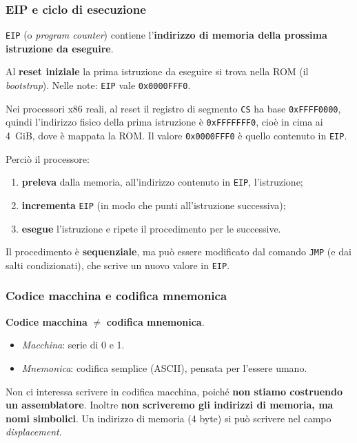 \documentclass[11pt,a4paper]{article}
\begin{document}
\subsubsection*{EIP e ciclo di esecuzione}

\texttt{EIP} (o \emph{program counter}) contiene l'\textbf{indirizzo di memoria della prossima istruzione da eseguire}.

Al \textbf{reset iniziale} la prima istruzione da eseguire si trova nella ROM (il \emph{bootstrap}). Nelle note: \texttt{EIP} vale \texttt{0x0000FFF0}.

\begin{integrazione}
Nei processori x86 reali, al reset il registro di segmento \texttt{CS} ha base \texttt{0xFFFF0000}, quindi l'indirizzo fisico della prima istruzione è \texttt{0xFFFFFFF0}, cioè in cima ai 4~GiB, dove è mappata la ROM. Il valore \texttt{0x0000FFF0} è quello contenuto in \texttt{EIP}.
\end{integrazione}

Perciò il processore:
\begin{enumerate}[leftmargin=*]
  \item \textbf{preleva} dalla memoria, all'indirizzo contenuto in \texttt{EIP}, l'istruzione;
  \item \textbf{incrementa} \texttt{EIP} (in modo che punti all'istruzione successiva);
  \item \textbf{esegue} l'istruzione e ripete il procedimento per le successive.
\end{enumerate}

Il procedimento è \textbf{sequenziale}, ma può essere modificato dal comando \texttt{JMP} (e dai salti condizionati), che scrive un nuovo valore in \texttt{EIP}.

\subsubsection*{Codice macchina e codifica mnemonica}

\textbf{Codice macchina} $\neq$ \textbf{codifica mnemonica}.
\begin{itemize}[leftmargin=*]
  \item \emph{Macchina}: serie di 0 e 1.
  \item \emph{Mnemonica}: codifica semplice (ASCII), pensata per l'essere umano.
\end{itemize}

Non ci interessa scrivere in codifica macchina, poiché \textbf{non stiamo costruendo un assemblatore}. Inoltre \textbf{non scriveremo gli indirizzi di memoria, ma nomi simbolici}. Un indirizzo di memoria (4 byte) si può scrivere nel campo \emph{displacement}.
\end{document}
